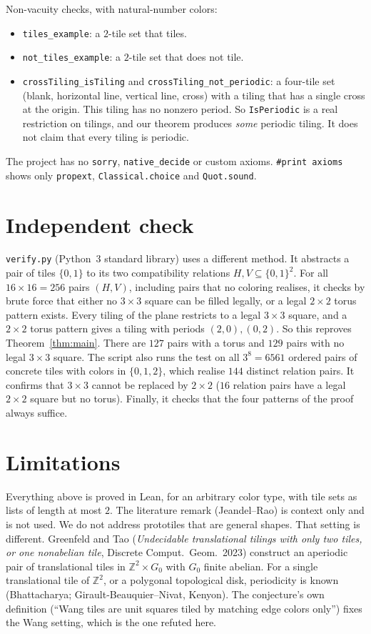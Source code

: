 \documentclass[11pt]{article}
\theoremstyle{definition}
\theoremstyle{remark}
\begin{document}
Non-vacuity checks, with natural-number colors:
\begin{itemize}
\item \texttt{tiles\_example}: a $2$-tile set that tiles.
\item \texttt{not\_tiles\_example}: a $2$-tile set that does not tile.
\item \texttt{crossTiling\_isTiling} and \texttt{crossTiling\_not\_periodic}: a
four-tile set (blank, horizontal line, vertical line, cross) with a tiling that
has a single cross at the origin. This tiling has no nonzero period. So
\texttt{IsPeriodic} is a real restriction on tilings, and our theorem
produces \emph{some} periodic tiling. It does not claim that every tiling is periodic.
\end{itemize}
The project has no \texttt{sorry}, \texttt{native\_decide} or custom axioms.
\texttt{\#print axioms} shows only \texttt{propext}, \texttt{Classical.choice}
and \texttt{Quot.sound}.

\section{Independent check}
\texttt{verify.py} (Python~3 standard library) uses a different method. It
abstracts a pair of tiles $\{0,1\}$ to its two compatibility relations
$H,V\subseteq\{0,1\}^2$. For all $16\times16=256$ pairs $(H,V)$, including
pairs that no coloring realises, it checks by brute force that either no
$3\times3$ square can be filled legally, or a legal $2\times2$ torus pattern
exists. Every tiling of the plane restricts to a legal $3\times3$ square, and a
$2\times2$ torus pattern gives a tiling with periods $(2,0),(0,2)$. So this
reproves Theorem~\ref{thm:main}. There are $127$ pairs with a torus and $129$
pairs with no legal $3\times3$ square. The script also runs the test on all
$3^8=6561$ ordered pairs of concrete tiles with colors in $\{0,1,2\}$, which
realise $144$ distinct relation pairs. It confirms that $3\times3$ cannot be
replaced by $2\times2$ ($16$ relation pairs have a legal $2\times2$ square but no
torus). Finally, it checks that the four patterns of the proof always suffice.

\section{Limitations}
Everything above is proved in Lean, for an arbitrary color type, with tile sets as
lists of length at most $2$. The literature remark (Jeandel--Rao) is context
only and is not used. We do not address prototiles that are general shapes.
That setting is different. Greenfeld and Tao (\emph{Undecidable translational
tilings with only two tiles, or one nonabelian tile}, Discrete Comput.\ Geom.\
2023) construct an aperiodic pair of translational tiles in
$\mathbb Z^2\times G_0$ with $G_0$ finite abelian. For a single translational
tile of $\mathbb Z^2$, or a polygonal topological disk, periodicity is known
(Bhattacharya; Girault-Beauquier--Nivat, Kenyon). The conjecture's own definition
(``Wang tiles are unit squares tiled by matching edge colors only'') fixes the
Wang setting, which is the one refuted here.
\end{document}
